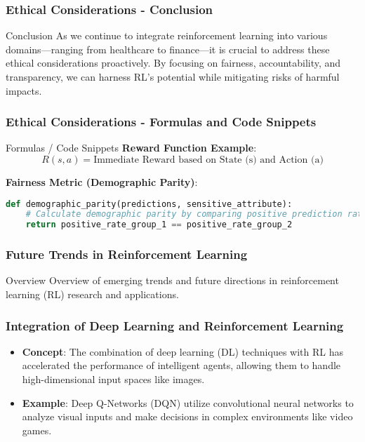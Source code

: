 \documentclass[aspectratio=169]{beamer}
\begin{document}
\begin{frame}[fragile]
    \frametitle{Ethical Considerations - Conclusion}
    \begin{block}{Conclusion}
        As we continue to integrate reinforcement learning into various domains—ranging from healthcare to finance—it is crucial to address these ethical considerations proactively. 
        By focusing on fairness, accountability, and transparency, we can harness RL's potential while mitigating risks of harmful impacts.
    \end{block}
\end{frame}

\begin{frame}[fragile]
    \frametitle{Ethical Considerations - Formulas and Code Snippets}
    \begin{block}{Formulas / Code Snippets}
        \textbf{Reward Function Example}:
        \begin{equation}
            R(s, a) = \text{Immediate Reward based on State (s) and Action (a)}
        \end{equation}
    
        \textbf{Fairness Metric (Demographic Parity)}:
        \begin{lstlisting}[language=Python]
def demographic_parity(predictions, sensitive_attribute):
    # Calculate demographic parity by comparing positive prediction rates across groups.
    return positive_rate_group_1 == positive_rate_group_2
        \end{lstlisting}
    \end{block}
\end{frame}

\begin{frame}
    \frametitle{Future Trends in Reinforcement Learning}
    \begin{block}{Overview}
        Overview of emerging trends and future directions in reinforcement learning (RL) research and applications.
    \end{block}
\end{frame}

\begin{frame}[fragile]
    \frametitle{Integration of Deep Learning and Reinforcement Learning}
    \begin{itemize}
        \item \textbf{Concept}: The combination of deep learning (DL) techniques with RL has accelerated the performance of intelligent agents, allowing them to handle high-dimensional input spaces like images.
        \item \textbf{Example}: Deep Q-Networks (DQN) utilize convolutional neural networks to analyze visual inputs and make decisions in complex environments like video games.
    \end{itemize}
\end{frame}
\end{document}
